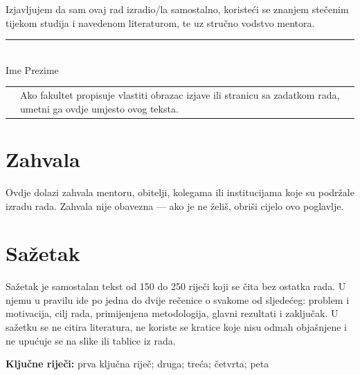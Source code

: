\documentclass[12pt,a4paper,oneside]{report}
\makeatletter
\newcommand{\Student}{Ime Prezime}
\newcommand{\napomena}[1]{%
  \par\vspace{6pt}
  \noindent\begin{tabular}{@{}p{3pt}@{\hspace{10pt}}p{\dimexpr\textwidth-13pt\relax}@{}}
  \cellcolor{fakplava} & \small #1
  \end{tabular}\par\vspace{6pt}}
\makeatother
\begin{document}
Izjavljujem da sam ovaj rad izradio/la samostalno, koristeći se znanjem stečenim tijekom studija i navedenom literaturom, te uz stručno vodstvo mentora.

\vspace{40pt}
\hfill\begin{minipage}{0.45\textwidth}
\centering
\rule{\linewidth}{0.4pt}\\
\small \Student
\end{minipage}

\napomena{Ako fakultet propisuje vlastiti obrazac izjave ili stranicu sa zadatkom rada, umetni ga ovdje umjesto ovog teksta.}

\chapter*{Zahvala}

Ovdje dolazi zahvala mentoru, obitelji, kolegama ili institucijama koje su podržale izradu rada. Zahvala nije obavezna — ako je ne želiš, obriši cijelo ovo poglavlje.

\chapter*{Sažetak}

Sažetak je samostalan tekst od 150 do 250 riječi koji se čita bez ostatka rada. U njemu u pravilu ide po jedna do dvije rečenice o svakome od sljedećeg: problem i motivacija, cilj rada, primijenjena metodologija, glavni rezultati i zaključak. U sažetku se ne citira literatura, ne koriste se kratice koje nisu odmah objašnjene i ne upućuje se na slike ili tablice iz rada.

\vspace{6pt}
\noindent\textbf{Ključne riječi:} prva ključna riječ; druga; treća; četvrta; peta

\vspace{26pt}
\par
\vspace{5pt}
\noindent{\color{fakplava}\rule{\textwidth}{2pt}}
\vspace{4pt}
\end{document}
